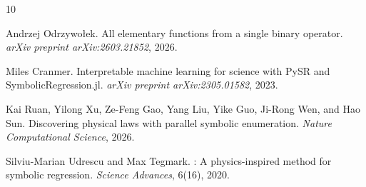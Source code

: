 \documentclass[11pt,a4paper]{article}
\begin{document}


\begin{thebibliography}{10}

Andrzej Odrzywołek.
\newblock All elementary functions from a single binary operator.
\newblock \emph{arXiv preprint arXiv:2603.21852}, 2026.

Miles Cranmer.
\newblock Interpretable machine learning for science with {PySR} and {SymbolicRegression.jl}.
\newblock \emph{arXiv preprint arXiv:2305.01582}, 2023.

Kai Ruan, Yilong Xu, Ze-Feng Gao, Yang Liu, Yike Guo, Ji-Rong Wen, and Hao Sun.
\newblock Discovering physical laws with parallel symbolic enumeration.
\newblock \emph{Nature Computational Science}, 2026.

Silviu-Marian Udrescu and Max Tegmark.
: A physics-inspired method for symbolic regression.
\newblock \emph{Science Advances}, 6(16), 2020.

\end{thebibliography}
\end{document}
